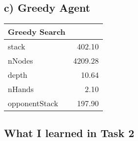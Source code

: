 \documentclass{article}
\begin{document}
\subsection{c) Greedy Agent}

    \begin{tabular}{lr}
        \toprule
        {Greedy Search} &        \\
        \midrule
        stack         &   402.10 \\
        nNodes        &  4209.28 \\
        depth         &    10.64 \\
        nHands        &     2.10 \\
        opponentStack &   197.90 \\
        \bottomrule
    \end{tabular}

\subsection{What I learned in Task 2}
\end{document}
